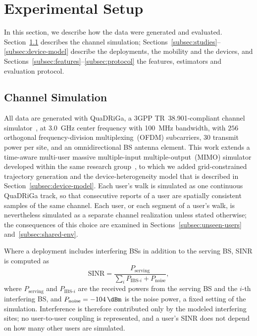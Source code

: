 \section{Experimental Setup}
\label{sec:setup}

In this section, we describe how the data were generated and evaluated. Section~\ref{subsec:channel-simulation} describes the channel simulation; Sections~\ref{subsec:studies}--\ref{subsec:device-model} describe the deployments, the mobility and the devices, and Sections~\ref{subsec:features}--\ref{subsec:protocol} the features, estimators and evaluation protocol.

\subsection{Channel Simulation}
\label{subsec:channel-simulation}

All data are generated with QuaDRiGa, a 3GPP TR~38.901-compliant channel simulator~\cite{3gpp38901,quadriga_paper,quadriga_website}, at \SI{3.0}{\giga\hertz} center frequency with \SI{100}{\mega\hertz} bandwidth, with $256$ orthogonal frequency-division multiplexing~(OFDM) subcarriers, \SI{30}{\dBm} transmit power per site, and an omnidirectional BS antenna element. This work extends a time-aware multi-user massive multiple-input multiple-output~(MIMO) simulator developed within the same research group~\cite{Israeli_5G_Massive_MIMO_2026,israeli_sarne_simulation}, to which we added grid-constrained trajectory generation and the device-heterogeneity model that is described in Section~\ref{subsec:device-model}. Each user's walk is simulated as one continuous QuaDRiGa track, so that consecutive reports of a user are spatially consistent samples of the same channel. Each user, or each segment of a user's walk, is nevertheless simulated as a separate channel realization unless stated otherwise; the consequences of this choice are examined in Sections~\ref{subsec:unseen-users} and~\ref{subsec:shared-env}.

Where a deployment includes interfering BSs in addition to the serving BS, SINR is computed as
\begin{equation}
  \mathrm{SINR} = \frac{P_{\text{serving}}}{\sum_i P_{\text{IBS-}i} + P_{\text{noise}}},
  \label{eq:sinr}
\end{equation}
where $P_{\text{serving}}$ and $P_{\text{IBS-}i}$ are the received powers from the serving BS and the $i$-th interfering BS, and $P_{\text{noise}} = \SI{-104}{\dBm}$ is the noise power, a fixed setting of the simulation. Interference is therefore contributed only by the modeled interfering sites; no user-to-user coupling is represented, and a user's SINR does not depend on how many other users are simulated.

